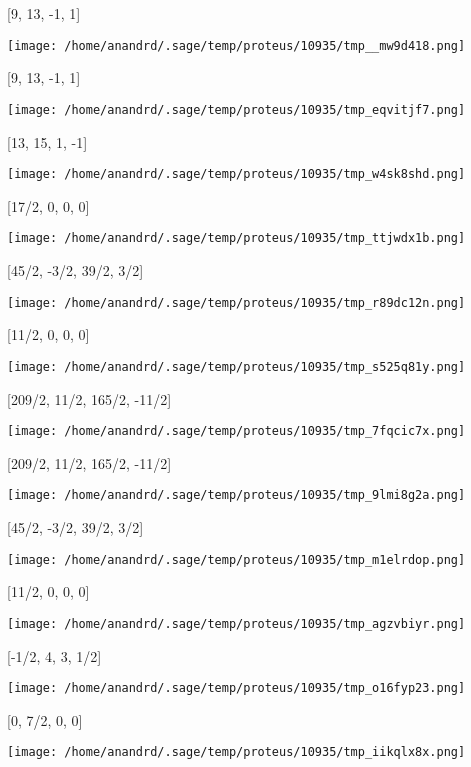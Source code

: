 \documentclass[11pt]{article}
\begin{document}
[9, 13, -1, 1]
\begin{center}
\texttt{[image: /home/anandrd/.sage/temp/proteus/10935/tmp\_\_mw9d418.png]}
\end{center}
[9, 13, -1, 1]
\begin{center}
\texttt{[image: /home/anandrd/.sage/temp/proteus/10935/tmp\_eqvitjf7.png]}
\end{center}
[13, 15, 1, -1]
\begin{center}
\texttt{[image: /home/anandrd/.sage/temp/proteus/10935/tmp\_w4sk8shd.png]}
\end{center}
[17/2, 0, 0, 0]
\begin{center}
\texttt{[image: /home/anandrd/.sage/temp/proteus/10935/tmp\_ttjwdx1b.png]}
\end{center}
[45/2, -3/2, 39/2, 3/2]
\begin{center}
\texttt{[image: /home/anandrd/.sage/temp/proteus/10935/tmp\_r89dc12n.png]}
\end{center}
[11/2, 0, 0, 0]
\begin{center}
\texttt{[image: /home/anandrd/.sage/temp/proteus/10935/tmp\_s525q81y.png]}
\end{center}
[209/2, 11/2, 165/2, -11/2]
\begin{center}
\texttt{[image: /home/anandrd/.sage/temp/proteus/10935/tmp\_7fqcic7x.png]}
\end{center}
[209/2, 11/2, 165/2, -11/2]
\begin{center}
\texttt{[image: /home/anandrd/.sage/temp/proteus/10935/tmp\_9lmi8g2a.png]}
\end{center}
[45/2, -3/2, 39/2, 3/2]
\begin{center}
\texttt{[image: /home/anandrd/.sage/temp/proteus/10935/tmp\_m1elrdop.png]}
\end{center}
[11/2, 0, 0, 0]
\begin{center}
\texttt{[image: /home/anandrd/.sage/temp/proteus/10935/tmp\_agzvbiyr.png]}
\end{center}
[-1/2, 4, 3, 1/2]
\begin{center}
\texttt{[image: /home/anandrd/.sage/temp/proteus/10935/tmp\_o16fyp23.png]}
\end{center}
[0, 7/2, 0, 0]
\begin{center}
\texttt{[image: /home/anandrd/.sage/temp/proteus/10935/tmp\_iikqlx8x.png]}
\end{center}
\end{document}
